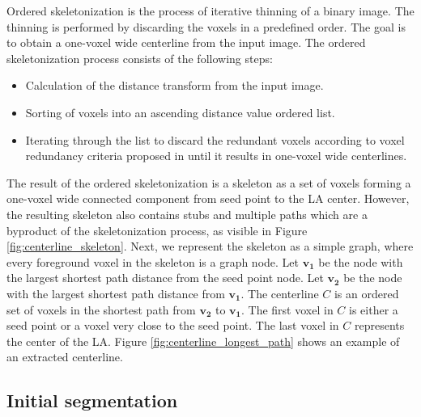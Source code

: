 \documentclass[review]{elsarticle}
\renewcommand{\vec}[1]{\mathbf{#1}} %
\begin{document}
Ordered skeletonization \cite{babin2018_Skeletonizationmethodvessel}
is the process of iterative thinning of a binary image. 
The thinning is performed by discarding the voxels in a predefined order.
The goal is to obtain a one-voxel wide centerline from the input image.
The ordered skeletonization process consists of the following steps:
\begin{itemize}
  \item Calculation of the distance transform from the input image.
  \item Sorting of voxels into an ascending distance value ordered list.
  \item Iterating through the list to discard the redundant voxels according to 
    voxel redundancy criteria proposed in \cite{babin2018_Skeletonizationmethodvessel}
    until it results in one-voxel wide centerlines.
\end{itemize}

The result of the ordered skeletonization is a skeleton as a set of voxels
forming a one-voxel wide connected component from seed point to the LA center.
However, the resulting skeleton also contains stubs and multiple paths which
are a byproduct of the skeletonization process, as visible in Figure
\ref{fig:centerline_skeleton}.  
  Next, we represent the skeleton as a simple graph, where every foreground voxel
  in the skeleton is a graph node.  
  Let $\vec{v_1}$ be the node  with the largest shortest path distance
  \cite{dijkstra1959_notetwoproblems} from the seed point node. Let $\vec{v_2}$
  be the node with the largest shortest path distance from $\vec{v_1}$.
  The centerline $C$ is an ordered set of voxels in the shortest path from $\vec{v_2}$ to 
  $\vec{v_1}$. The first voxel in $C$ is either a seed point or a voxel very close 
  to the seed point. The last voxel in $C$ represents the center of the LA.
Figure
\ref{fig:centerline_longest_path} shows an example of an extracted centerline.






\subsection{Initial segmentation}
\label{sec:initial_segmentation}
\end{document}
